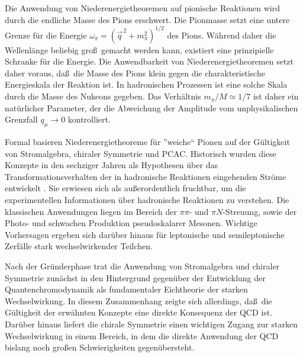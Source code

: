 Die Anwendung von Niederenergietheoremen auf pionische 
Reaktionen wird durch die endliche Masse des Pions 
erschwert. Die Pionmasse setzt eine untere Grenze f\"ur 
die Energie  $\omega_\pi=(\vec{q}^{\, 2} +m_\pi^2)^{1/2}$
des Pions. W\"ahrend daher die Wellenl\"ange beliebig gro\ss\
gemacht werden kann, existiert eine prinzipielle Schranke 
f\"ur die Energie. Die Anwendbarkeit von Niederenergietheoremen
setzt daher voraus, da\ss\ die Masse des Pions klein gegen die 
charakteristische Energieskala der Reaktion ist. In hadronischen 
Prozessen ist eine solche Skala durch die Masse des Nukeons gegeben. 
Das Verh\"altnis $m_\pi/M\simeq 1/7$ ist daher ein nat\"urlicher
Parameter, der die Abweichung der  Amplitude vom unphysikalischen
Grenzfall $q_\mu \to 0$ kontrolliert.

Formal basieren Niederenergietheoreme f\"ur ''weiche`` Pionen auf
der G\"ultigkeit von Strom\-al\-ge\-bra, chiraler Symmetrie und
PCAC. Historisch wurden diese Konzepte in den sechziger Jahren 
als Hypothesen \"uber das Transformationsverhalten der in
hadronische Reaktionen eingehenden Str\"ome entwickelt
\cite{AD68,AFF73}. Sie erwiesen sich als au\ss erordentlich
fruchtbar, um die  experimentellen 
Informationen \"uber hadronische Reaktionen zu verstehen. 
Die klassischen Anwendungen liegen im Bereich
der $\pi\pi$- und $\pi N$-Streuung, sowie der Photo- und schwachen
Produktion pseudoskalarer Mesonen. Wichtige Vorhersagen ergeben
sich dar\"uber hinaus f\"ur leptonische und semileptonische Zerf\"alle
stark wechselwirkender Teilchen.    
  
Nach der Gr\"underphase trat die Anwendung von Stromalgebra und
chiraler Symmetrie zun\"achst in den Hintergrund gegen\"uber
der Entwicklung der Quantenchromodynamik als fundamentaler
Eichtheorie der starken Wechselwirkung. In diesem Zusammenhang 
zeigte sich allerdings, da\ss\ die G\"ultigkeit der erw\"ahnten Konzepte 
eine direkte Konsequenz der QCD ist. Dar\"uber hinaus liefert die chirale 
Symmetrie  einen wichtigen Zugang zur starken Wechselwirkung
in einem Bereich, in dem die direkte Anwendung der QCD
bislang noch gro\ss en Schwierigkeiten gegen\"ubersteht.


